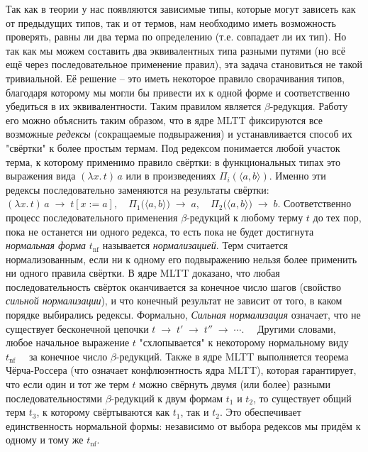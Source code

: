 \documentclass[14pt]{extarticle}
\begin{document}
	Так как в теории у нас появляются зависимые типы, которые могут зависеть как от предыдущих типов, так и от термов, нам необходимо иметь возможность проверять, равны ли два терма по определению (т.е. совпадает ли их тип). Но так как мы можем составить два эквивалентных типа разными путями (но всё ещё через последовательное применение правил), эта задача становиться не такой тривиальной. Её решение -- это иметь некоторое правило сворачивания типов, благодаря которому мы могли бы привести их к одной форме и соответственно убедиться в их эквивалентности. Таким правилом является \(\beta\)-редукция. Работу его можно объяснить таким образом, что в ядре MLTT фиксируются все возможные \emph{редексы} (сокращаемые подвыражения) и устанавливается способ их "свёртки" к более простым термам. Под редексом понимается любой участок терма, к которому применимо правило свёртки: в функциональных типах это выражения вида \((\lambda x.\,t)\,a\) или в произведениях \(\Pi_i(\langle a,b\rangle)\). Именно эти редексы последовательно заменяются на результаты свёртки:
	\(
	 (\lambda x.\,t)\,a \;\longrightarrow\; t[x:=a],
	 \quad
	 \Pi_1\bigl(\langle a,b\rangle\bigr)\;\longrightarrow\;a,
	 \quad
	 \Pi_2\bigl(\langle a,b\rangle\bigr)\;\longrightarrow\;b
	\). Соответственно процесс последовательного применения \(\beta\)-редукций к любому терму \(t\) до тех пор, пока не останется ни одного редекса, то есть пока не будет достигнута \emph{нормальная форма} \(t_{\mathrm{nf}}\) называется \textit{нормализацией}. Терм считается нормализованным, если ни к одному его подвыражению нельзя более применить ни одного правила свёртки. В ядре MLTT доказано, что любая последовательность свёрток оканчивается за конечное число шагов (свойство \emph{сильной нормализации}), и что конечный результат не зависит от того, в каком порядке выбирались редексы. Формально, \emph{Сильная нормализация} означает, что не существует бесконечной цепочки
	 	\(
	 	t \;\longrightarrow\; t' \;\longrightarrow\; t'' \;\longrightarrow\; \cdots. \quad
	 	\)
	 	Другими словами, любое начальное выражение \(t\) "схлопывается" к некоторому нормальному виду \(t_{\mathrm{nf}} \quad\) за конечное число \(\beta\)-редукций. Также в ядре MLTT выполняется теорема Чёрча-Россера (что означает конфлюэнтность ядра MLTT), которая гарантирует, что если один и тот же терм \(t\) можно свёрнуть двумя (или более) разными последовательностями \(\beta\)-редукций к двум формам \(t_1\) и \(t_2\), то существует общий терм \(t_3\), к которому свёртываются как \(t_1\), так и \(t_2\). Это обеспечивает единственность нормальной формы: независимо от выбора редексов мы придём к одному и тому же \(t_{\mathrm{nf}}\).  
	 	 
\end{document}
